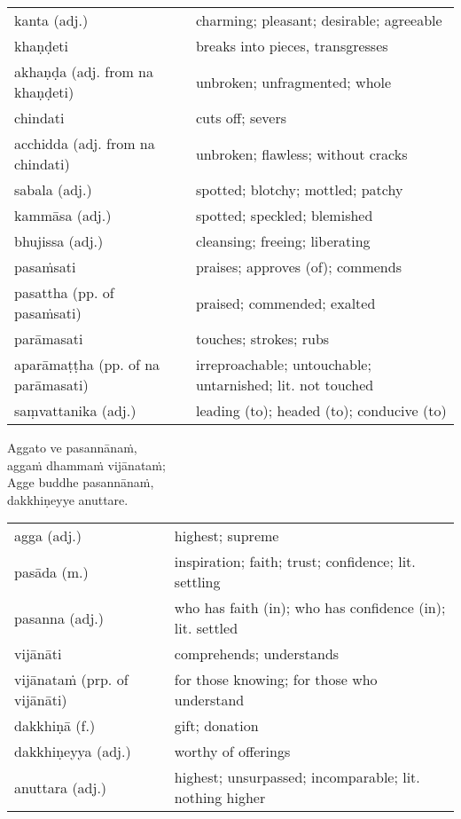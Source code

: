 \documentclass[11pt,oneside]{memoir}
\begin{document}
\begin{longtable}{L{\colOne} L{\colTwo}}
kanta (adj.) & charming; pleasant; desirable; agreeable\\[0pt]
khaṇḍeti & breaks into pieces, transgresses\\[0pt]
akhaṇḍa (adj. from na khaṇḍeti) & unbroken; unfragmented; whole\\[0pt]
chindati & cuts off; severs\\[0pt]
acchidda (adj. from na chindati) & unbroken; flawless; without cracks\\[0pt]
sabala (adj.) & spotted; blotchy; mottled; patchy\\[0pt]
kammāsa (adj.) & spotted; speckled; blemished\\[0pt]
bhujissa (adj.) & cleansing; freeing; liberating\\[0pt]
pasaṁsati & praises; approves (of); commends\\[0pt]
pasattha (pp. of pasaṁsati) & praised; commended; exalted\\[0pt]
parāmasati & touches; strokes; rubs\\[0pt]
aparāmaṭṭha (pp. of na parāmasati) & irreproachable; untouchable; untarnished; lit. not touched\\[0pt]
saṃvattanika (adj.) & leading (to); headed (to); conducive (to)\\[0pt]
\end{longtable}

\begin{spacedquote}
Aggato ve pasannānaṁ, \\[0pt]
aggaṁ dhammaṁ vijānataṁ; \\[0pt]
Agge buddhe pasannānaṁ, \\[0pt]
dakkhiṇeyye anuttare.
\end{spacedquote}

\begin{longtable}{L{\colOne} L{\colTwo}}
agga (adj.) & highest; supreme\\[0pt]
pasāda (m.) & inspiration; faith; trust; confidence; lit. settling\\[0pt]
pasanna (adj.) & who has faith (in); who has confidence (in); lit. settled\\[0pt]
vijānāti & comprehends; understands\\[0pt]
vijānataṁ (prp. of vijānāti) & for those knowing; for those who understand\\[0pt]
dakkhiṇā (f.) & gift; donation\\[0pt]
dakkhiṇeyya (adj.) & worthy of offerings\\[0pt]
anuttara (adj.) & highest; unsurpassed; incomparable; lit. nothing higher\\[0pt]
\end{longtable}
\end{document}
